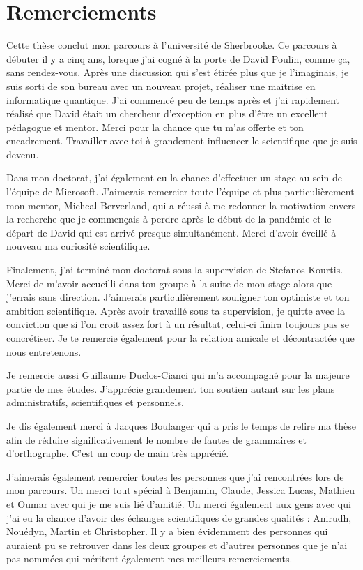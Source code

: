 \begin{comment}
\end{comment}

\chapter*{Remerciements}

Cette thèse conclut mon parcours à l'université de Sherbrooke.
Ce parcours à débuter il y a cinq ans,
lorsque j'ai cogné à la porte de David Poulin,
comme ça, sans rendez-vous.
Après une discussion qui s'est étirée plus que je l'imaginais,
je suis sorti de son bureau avec un nouveau projet, 
réaliser une maitrise en informatique quantique.
J'ai commencé peu de temps après et j'ai rapidement réalisé que David 
était un chercheur d'exception en plus d'être un excellent pédagogue et mentor.
Merci pour la chance que tu m'as offerte et ton encadrement.
Travailler avec toi à grandement influencer le scientifique que je suis devenu.

Dans mon doctorat,
j'ai également eu la chance d'effectuer un stage au sein de l'équipe de Microsoft.
J'aimerais remercier toute l'équipe et plus particulièrement mon mentor,
Micheal Berverland, qui a réussi à me redonner la motivation envers la recherche
que je commençais à perdre après le début de la pandémie et le départ de David qui est
arrivé presque simultanément.
Merci d'avoir éveillé à nouveau ma curiosité scientifique.

Finalement,
j'ai terminé mon doctorat sous la supervision de Stefanos Kourtis.
Merci de m'avoir accueilli dans ton groupe à la suite de mon stage alors que j'errais sans direction.
J'aimerais particulièrement souligner ton optimiste et ton ambition scientifique.
Après avoir travaillé sous ta supervision,
je quitte avec la conviction que si l'on croit assez fort à un résultat,
celui-ci finira toujours pas se concrétiser.
Je te remercie également pour la relation amicale et décontractée que nous entretenons.

Je remercie aussi Guillaume Duclos-Cianci qui m'a accompagné pour la majeure partie de mes études.
J'apprécie grandement ton soutien autant sur les plans administratifs, 
scientifiques et personnels.

Je dis également merci à Jacques Boulanger qui a pris le temps de relire ma thèse afin de réduire
significativement le nombre de fautes de grammaires et d'orthographe. C'est un coup de main très apprécié.  

J'aimerais également remercier toutes les personnes que j'ai rencontrées lors de mon parcours.
Un merci tout spécial à Benjamin, Claude, Jessica Lucas, Mathieu et Oumar avec qui
je me suis lié d'amitié.
Un merci également aux gens avec qui j'ai eu la chance d'avoir des échanges scientifiques
de grandes qualités :  Anirudh, Nouédyn, Martin et Christopher.
Il y a bien évidemment des personnes qui auraient pu se retrouver dans les deux groupes
et d'autres personnes que je n'ai pas nommées qui méritent également mes meilleurs remerciements. 

